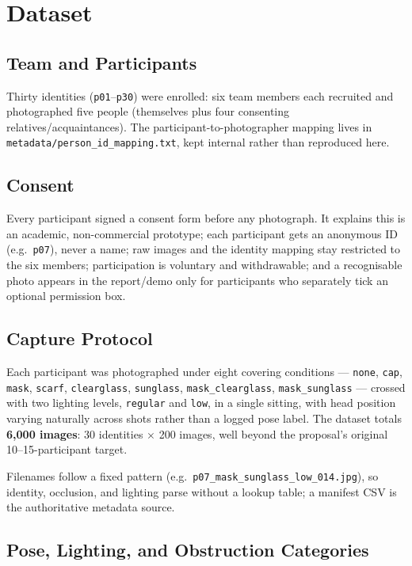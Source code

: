 \documentclass[11pt]{article}
\begin{document}
\section{Dataset}
\label{sec:dataset}

\subsection{Team and Participants}

Thirty identities (\texttt{p01}--\texttt{p30}) were enrolled: six team members each recruited and photographed five people (themselves plus four consenting relatives/acquaintances). The participant-to-photographer mapping lives in \texttt{metadata/person\_id\_mapping.txt}, kept internal rather than reproduced here.

\subsection{Consent}

Every participant signed a consent form before any photograph. It explains this is an academic, non-commercial prototype; each participant gets an anonymous ID (e.g.\ \texttt{p07}), never a name; raw images and the identity mapping stay restricted to the six members; participation is voluntary and withdrawable; and a recognisable photo appears in the report/demo only for participants who separately tick an optional permission box.

\subsection{Capture Protocol}

Each participant was photographed under eight covering conditions --- \texttt{none}, \texttt{cap}, \texttt{mask}, \texttt{scarf}, \texttt{clearglass}, \texttt{sunglass}, \texttt{mask\_clearglass}, \texttt{mask\_sunglass} --- crossed with two lighting levels, \texttt{regular} and \texttt{low}, in a single sitting, with head position varying naturally across shots rather than a logged pose label. The dataset totals \textbf{6{,}000 images}: 30 identities $\times$ 200 images, well beyond the proposal's original 10--15-participant target.

Filenames follow a fixed pattern (e.g.\ \texttt{p07\_mask\_sunglass\_low\_014.jpg}), so identity, occlusion, and lighting parse without a lookup table; a manifest CSV is the authoritative metadata source.

\subsection{Pose, Lighting, and Obstruction Categories}
\label{sec:categories}
\end{document}
